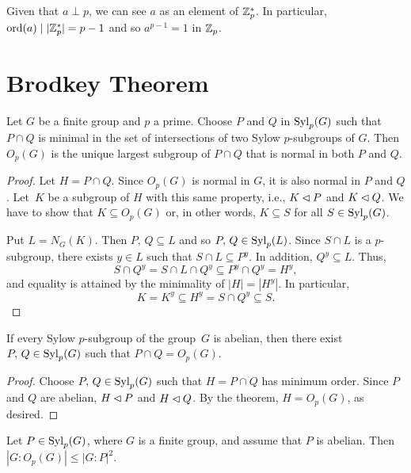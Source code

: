 \begin{solution} Given that $a\perp p$, we can see $a$ as an element of $\mathbb{Z}_p^*$. In particular, ${\rm ord}(a)\mid|\mathbb{Z}_p^*|=p-1$ and so $a^{p-1}=1$ in $\mathbb{Z}_p$.  \end{solution}

\section{Brodkey Theorem}

\begin{thm}\label{brodkey-general}
    Let\/ $G$ be a finite group and\/ $p$ a prime. Choose\/ $P$ and\/ $Q$ in ${\rm Syl}_p(G)$ such that\/ $P\cap Q$ is minimal in the set of intersections of two Sylow\/ $p$-subgroups of\/ $G$. Then\/ $O_p(G)$ is the unique largest subgroup of\/ $P\cap Q$ that is normal in both $P$ and $Q$.
\end{thm}

\begin{proof} Let $H=P\cap Q$. Since $O_p(G)$ is normal in $G$, it is also normal in $P$ and $Q$. Let~$K$ be a subgroup of $H$ with this same property, i.e., $K\lhd P$ and $K\lhd Q$. We have to show that $K\subseteq O_p(G)$ or, in other words, $K\subseteq S$ for all $S\in{\rm Syl}_p(G)$.

Put $L=N_G(K)$. Then $P,\, Q\subseteq L$ and so $P,\,Q\in{\rm Syl}_p(L)$. Since $S\cap L$ is a $p$-subgroup, there exists $y\in L$ such that $S\cap L\subseteq P^y$. In addition, $Q^y\subseteq L$. Thus,
$$
    S\cap Q^y = S\cap L\cap Q^y \subseteq P^y\cap Q^y = H^y,
$$
and equality is attained by the minimality of $|H|=|H^y|$. In particular,
$$
    K=K^y\subseteq H^y = S\cap Q^y \subseteq S.
$$
 \end{proof}

\begin{cor}\label{brodkey-thm}{}
    If every Sylow $p$-subgroup of the group\/~$G$ is abelian, then there exist $P,\,Q\in{\rm Syl}_p(G)$ such that $P\cap Q = O_p(G)$.
\end{cor}

\begin{proof} Choose $P,\,Q\in{\rm Syl}_p(G)$ such that $H=P\cap Q$ has minimum order. Since $P$ and $Q$ are abelian, $H\lhd P$ and $H\lhd Q$. By the theorem, $H=O_p(G)$, as desired.  \end{proof}

\begin{cor}
    Let\/ $P\in{\rm Syl}_p(G)$, where\/ $G$ is a finite group, and assume that\/ $P$ is abelian. Then $|G:O_p(G)|\le|G:P|^2$.
\end{cor}

